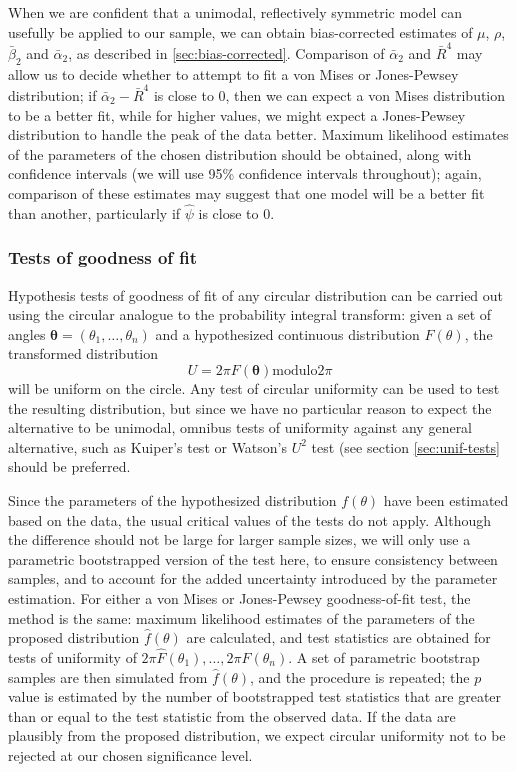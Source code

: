 \documentclass[../../ArchStats.tex]{subfiles}
\begin{document}
When we are confident that a unimodal, reflectively symmetric model can usefully be applied to our sample, we can obtain bias-corrected estimates of $\mu$, $\rho$, $\bar{\beta}_2$ and $\bar{\alpha}_2$, as described in \ref{sec:bias-corrected}. Comparison of $\bar{\alpha}_2$ and $\bar{R}^4$ may allow us to decide whether to attempt to fit a von Mises or Jones-Pewsey distribution; if $\bar{\alpha}_2 - \bar{R}^4$ is close to 0, then we can expect a von Mises distribution to be a better fit, while for higher values, we might expect a Jones-Pewsey distribution to handle the peak of the data better. Maximum likelihood estimates of the parameters of the chosen distribution should be obtained, along with confidence intervals (we will use 95\% confidence intervals throughout); again, comparison of these estimates may suggest that one model will be a better fit than another, particularly if $\hat{\psi}$ is close to 0.

\subsubsection{Tests of goodness of fit}

Hypothesis tests of goodness of fit of any circular distribution can be carried out using the circular analogue to the probability integral transform: given a set of angles $\mathbf{\theta} = (\theta_1, \dots, \theta_n)$ and a hypothesized continuous distribution $F(\theta)$, the transformed distribution
\[U = 2\pi F(\mathbf{\theta}) \text{modulo} 2\pi\]
will be uniform on the circle. Any test of circular uniformity can be used to test the resulting distribution, but since we have no particular reason to expect the alternative to be unimodal, omnibus tests of uniformity against any general alternative, such as Kuiper's test or Watson's $U^2$ test (see section \ref{sec:unif-tests} should be preferred.

Since the parameters of the hypothesized distribution $f(\theta)$ have been estimated based on the data, the usual critical values of the tests do not apply. Although the difference should not be large for larger sample sizes, we will only use a parametric bootstrapped version of the test here, to ensure consistency between samples, and to account for the added uncertainty introduced by the parameter estimation. For either a von Mises or Jones-Pewsey goodness-of-fit test, the method is the same: maximum likelihood estimates of the parameters of the proposed distribution $\hat{f}(\theta)$ are calculated, and test statistics are obtained for tests of uniformity of $2\pi \hat{F}(\theta_1), \dots, 2\pi \hat{F}(\theta_n)$. A set of parametric bootstrap samples are then simulated from $\hat{f}(\theta)$, and the procedure is repeated; the $p$ value is estimated by the number of bootstrapped test statistics that are greater than or equal to the test statistic from the observed data. If the data are plausibly from the proposed distribution, we expect circular uniformity not to be rejected at our chosen significance level.
\end{document}
